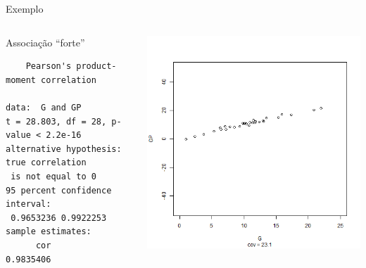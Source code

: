 \documentclass{beamer}
\begin{document}
\begin{frame}[fragile]{\scriptsize Exemplo}
  \begin{columns}
    \begin{column}{6cm}
      \begin{exampleblock}{Associação ``forte''}
        \tiny
\begin{verbatim}
	Pearson's product-moment correlation

data:  G and GP
t = 28.803, df = 28, p-value < 2.2e-16
alternative hypothesis: true correlation
 is not equal to 0
95 percent confidence interval:
 0.9653236 0.9922253
sample estimates:
      cor 
0.9835406
\end{verbatim}
    \end{exampleblock}
   \end{column}
    \begin{column}{4cm}
  \begin{center}
    \includegraphics[height=.8\textheight]{Cap17/anim-1}
  \end{center}
    \end{column}
\end{columns}
\end{frame}
\end{document}
